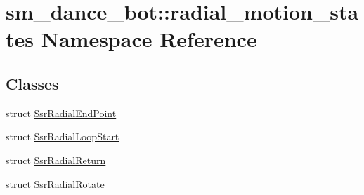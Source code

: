 \hypertarget{namespacesm__dance__bot_1_1radial__motion__states}{}\section{sm\+\_\+dance\+\_\+bot\+:\+:radial\+\_\+motion\+\_\+states Namespace Reference}
\label{namespacesm__dance__bot_1_1radial__motion__states}
\subsection*{Classes}
\begin{DoxyCompactItemize}
\item 
struct \hyperlink{structsm__dance__bot_1_1radial__motion__states_1_1SsrRadialEndPoint}{Ssr\+Radial\+End\+Point}
\item 
struct \hyperlink{structsm__dance__bot_1_1radial__motion__states_1_1SsrRadialLoopStart}{Ssr\+Radial\+Loop\+Start}
\item 
struct \hyperlink{structsm__dance__bot_1_1radial__motion__states_1_1SsrRadialReturn}{Ssr\+Radial\+Return}
\item 
struct \hyperlink{structsm__dance__bot_1_1radial__motion__states_1_1SsrRadialRotate}{Ssr\+Radial\+Rotate}
\end{DoxyCompactItemize}
